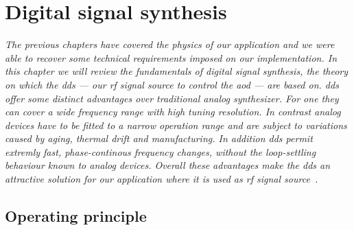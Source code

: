 \chapter{Digital signal synthesis}\label{ch:digital_signal_synthesis}

\textit{The previous chapters have covered the physics of our application and
we were able to recover some technical requirements imposed on our
implementation. In this chapter we will review the fundamentals of digital
signal synthesis, the theory on which the \gls{dds} --- our \gls{rf} signal
source to control the \gls{aod} --- are based on. \gls{dds} offer some
distinct advantages over traditional analog synthesizer. For one they can
cover a wide frequency range with high tuning resolution. In contrast analog
devices have to be fitted to a narrow operation range and are subject to
variations caused by aging, thermal drift and manufacturing. In addition
\gls{dds} permit extremly fast, phase-continous frequency changes,
without the loop-settling behaviour known to analog devices. Overall these
advantages make the \gls{dds} an attractive solution for our application where
it is used as \gls{rf} signal source~\cite{ADTutDDS}.}

\section{Operating principle}

